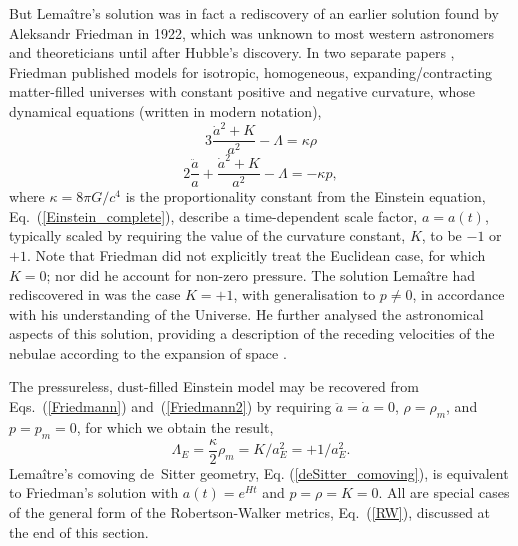 But Lema\^{i}tre's solution was in fact a rediscovery of an earlier solution found by Aleksandr Friedman in 1922, which was unknown to most western astronomers and theoreticians until after Hubble's discovery. In two separate papers \cite{Friedmann1922,Friedmann1999a,Friedmann1924,Friedmann1999b}, Friedman published models for isotropic, homogeneous, expanding/contracting matter-filled universes with constant positive and negative curvature, whose dynamical equations (written in modern notation),
\begin{equation}
3\frac{\dot{a}^2+K}{a^2}-\Lambda=\kappa\rho\label{Friedmann}
\end{equation}
\begin{equation}
2\frac{\ddot{a}}{a}+\frac{\dot{a}^2+K}{a^2}-\Lambda=-\kappa{p},\label{Friedmann2}
\end{equation}
where $\kappa=8\pi{G}/c^4$ is the proportionality constant from the Einstein equation, Eq.~(\ref{Einstein_complete}), describe a time-dependent scale factor, $a=a(t)$, typically scaled by requiring the value of the curvature constant, $K$, to be $-1$ or $+1$. Note that Friedman did not explicitly treat the Euclidean case, for which $K=0$; nor did he account for non-zero pressure. The solution Lema\^{i}tre had rediscovered in \cite{Lemaitre1927} was the case $K=+1$, with generalisation to $p\neq0$, in accordance with his understanding of the Universe. He further analysed the astronomical aspects of this solution, providing a description of the receding velocities of the nebulae according to the expansion of space \cite{Krasinski1999b}. 

The pressureless, dust-filled Einstein model may be recovered from Eqs.~(\ref{Friedmann}) and~(\ref{Friedmann2}) by requiring $\ddot{a}=\dot{a}=0$, $\rho=\rho_m$, and $p=p_m=0$, for which we obtain the result,
\begin{equation}
\Lambda_{E}=\frac{\kappa}{2}\rho_m=K/a_{E}^2=+1/a_E^2.\label{a_E}
\end{equation}
Lema\^{i}tre's comoving de~Sitter geometry, Eq. (\ref{deSitter_comoving}), is equivalent to Friedman's solution with $a(t)=e^{Ht}$ and $p=\rho=K=0$. All are special cases of the general form of the Robertson-Walker metrics, Eq.~(\ref{RW}), discussed at the end of this section.

